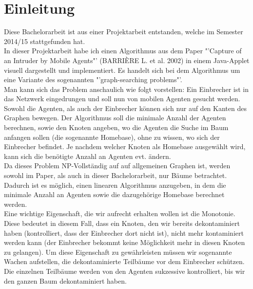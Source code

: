 \section{Einleitung}
Diese Bachelorarbeit ist aus einer Projektarbeit entstanden, welche im Semester 2014/15 stattgefunden hat.\\

In dieser Projektarbeit habe ich einen Algorithmus aus dem Paper "'Capture of an Intruder by Mobile Agents"' (BARRIÈRE L. et al. 2002) in einem Java-Applet visuell dargestellt und implementiert. Es handelt sich bei dem Algorithmus um eine Variante des sogenannten "'graph-searching problems"'.\\

Man kann sich das Problem anschaulich wie folgt vorstellen: Ein Einbrecher ist in das Netzwerk eingedrungen und soll nun von mobilen Agenten gesucht werden. Sowohl die Agenten, als auch der Einbrecher können sich nur auf den Kanten des Graphen bewegen. Der Algorithmus soll die minimale Anzahl der Agenten berechnen, sowie den Knoten angeben, wo die Agenten die Suche im Baum anfangen sollen (die sogenannte Homebase), ohne zu wissen, wo sich der Einbrecher befindet. Je nachdem welcher Knoten als Homebase ausgewählt wird, kann sich die benötigte Anzahl an Agenten evt. ändern.\\

Da dieses Problem NP-Vollständig auf auf allgemeinen Graphen ist, werden sowohl im Paper, als auch in dieser Bachelorarbeit, nur Bäume betrachtet. Dadurch ist es möglich, einen linearen Algorithmus anzugeben, in dem die minimale Anzahl an Agenten sowie die dazugehörige Homebase berechnet werden.\\

Eine wichtige Eigenschaft, die wir aufrecht erhalten wollen ist die Monotonie. Diese bedeutet in diesem Fall, dass ein Knoten, den wir bereits dekontaminiert haben (kontrolliert, dass der Einbrecher dort nicht ist), nicht mehr kontaminiert werden kann (der Einbrecher bekommt keine Möglichkeit mehr in diesen Knoten zu gelangen). Um diese Eigenschaft zu gewährleisten müssen wir sogenannte Wachen aufstellen, die dekontaminierte Teilbäume vor dem Einbrecher schützen. Die einzelnen Teilbäume werden von den Agenten sukzessive kontrolliert, bis wir den ganzen Baum dekontaminiert haben.\\
\\
\\

